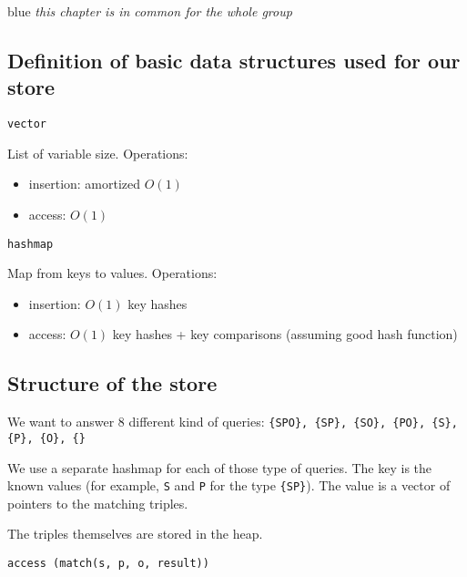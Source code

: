 
\begin{mybox}{blue}
\emph{this chapter is in common for the whole group}
\end{mybox}

\subsection{Definition of basic data structures used for our store}

\begin{tcolorbox}
\verb!vector!
\end{tcolorbox}

List of variable size. Operations:
\begin{itemize}
    \item
    insertion: amortized $O(1)$
    \item
    access: $O(1)$
\end{itemize}


\bigskip
\begin{tcolorbox}
\verb!hashmap!
\end{tcolorbox}

Map from keys to values. Operations:
\begin{itemize}
    \item
    insertion: $O(1)$ key hashes
    \item
    access: $O(1)$ key hashes + key comparisons (assuming good hash function)
\end{itemize}



\subsection{Structure of the store}
We want to answer 8 different kind of queries: \verb!{SPO}, {SP}, {SO}, {PO}, {S}, {P}, {O}, {}!

We use a separate hashmap for each of those type of queries. The key is the known values (for example, \verb!S! and \verb!P! for the type \verb!{SP}!). The value is a vector of pointers to the matching triples.

The triples themselves are stored in the heap.

\bigskip
\begin{tcolorbox}
\verb!access (match(s, p, o, result))!
\end{tcolorbox}

